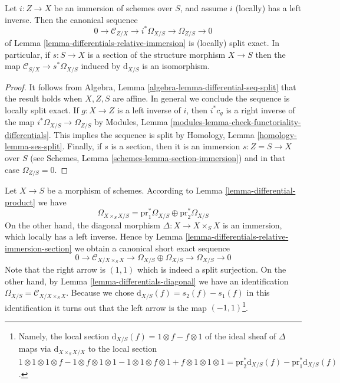 \begin{lemma}
\label{lemma-differentials-relative-immersion-section}
Let $i : Z \to X$ be an immersion of schemes over $S$, and
assume $i$ (locally) has a left inverse. Then the canonical
sequence
$$
0 \to \mathcal{C}_{Z/X} \to i^*\Omega_{X/S} \to \Omega_{Z/S} \to 0
$$
of
Lemma \ref{lemma-differentials-relative-immersion}
is (locally) split exact. In particular, if $s : S \to X$ is a section
of the structure morphism $X \to S$ then the map
$\mathcal{C}_{S/X} \to s^*\Omega_{X/S}$ induced by
$\text{d}_{X/S}$ is an isomorphism.
\end{lemma}

\begin{proof}
It follows from Algebra, Lemma \ref{algebra-lemma-differential-seq-split}
that the result holds when $X, Z, S$ are affine. In general we conclude
the sequence is locally split exact. If $g : X \to Z$ is a left inverse
of $i$, then $i^*c_g$ is a right inverse of the map
$i^*\Omega_{X/S} \to \Omega_{Z/S}$ by
Modules, Lemma \ref{modules-lemma-check-functoriality-differentials}. 
This implies the sequence is split by
Homology, Lemma \ref{homology-lemma-ses-split}.
Finally, if $s$ is a section, then it is an immersion $s : Z = S \to X$
over $S$ (see Schemes, Lemma \ref{schemes-lemma-section-immersion})
and in that case $\Omega_{Z/S} = 0$.
\end{proof}

\begin{remark}
\label{remark-differentials-diagonal}
Let $X \to S$ be a morphism of schemes. According to
Lemma \ref{lemma-differential-product}
we have
$$
\Omega_{X \times_S X/S} =
\text{pr}_1^*\Omega_{X/S} \oplus \text{pr}_2^*\Omega_{X/S}
$$
On the other hand, the diagonal morphism $\Delta : X \to X \times_S X$
is an immersion, which locally has a left inverse. Hence by
Lemma \ref{lemma-differentials-relative-immersion-section}
we obtain a canonical short exact sequence
$$
0 \to \mathcal{C}_{X/X \times_S X} \to \Omega_{X/S} \oplus \Omega_{X/S}
\to \Omega_{X/S} \to 0
$$
Note that the right arrow is $(1, 1)$ which is indeed a split surjection.
On the other hand, by Lemma \ref{lemma-differentials-diagonal}
we have an identification $\Omega_{X/S} = \mathcal{C}_{X/X \times_S X}$.
Because we chose $\text{d}_{X/S}(f) = s_2(f) - s_1(f)$ in this
identification it turns out that the left arrow is the map
$(-1, 1)$\footnote{Namely,
the local section $\text{d}_{X/S}(f) = 1 \otimes f - f \otimes 1$ of the
ideal sheaf of $\Delta$ maps via $\text{d}_{X \times_S X/X}$ to the
local section
$1 \otimes 1 \otimes 1 \otimes f - 1 \otimes f \otimes 1 \otimes 1
-1 \otimes 1 \otimes f \otimes 1 + f \otimes 1 \otimes 1 \otimes 1 =
\text{pr}_2^*\text{d}_{X/S}(f) - \text{pr}_1^*\text{d}_{X/S}(f)$.}.
\end{remark}

